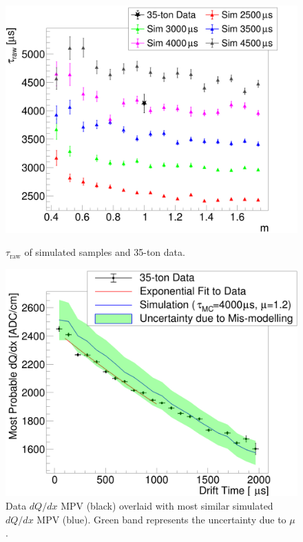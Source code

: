 \documentclass[10pt,a4paper]{article}
\begin{document}
\begin{figure}
\centering
\begin{minipage}[t]{0.48\textwidth}
\centering
\includegraphics[width=\textwidth]{canvelifeVnoise.png}
\caption{$\tau_{\text{raw}}$ of simulated samples and 35-ton data.}
\label{fig:elifeVnoise}
\end{minipage}\hfill
\begin{minipage}[t]{0.48\textwidth}
\centering
\includegraphics[width=\textwidth]{canvmpvpaper.png}
\caption{Data $dQ/dx$ MPV (black) overlaid with most similar simulated $dQ/dx$ MPV (blue). Green band represents the uncertainty due to $\mu$.}
\label{fig:mpvchoice}
\end{minipage}
\end{figure}
\end{document}
